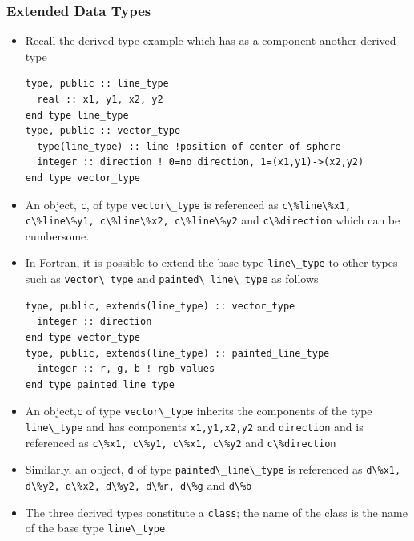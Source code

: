 \documentclass[c,mathserif,compress,xcolor=svgnames]{beamer}
\newcommand{\lstfortran}[1]{\lstinline[language={[90]Fortran},basicstyle=\footnotesize\ttfamily]|#1|}
\begin{document}
\begin{frame}
  \frametitle{\small Extended Data Types}
  \begin{itemize}
    \item Recall the derived type example which has as a component another derived type
      \begin{lstlisting}[language={[90]Fortran}]
type, public :: line_type 
  real :: x1, y1, x2, y2
end type line_type 
type, public :: vector_type
  type(line_type) :: line !position of center of sphere
  integer :: direction ! 0=no direction, 1=(x1,y1)->(x2,y2) 
end type vector_type
      \end{lstlisting}
    \item An object, \lstfortran{c}, of type \lstfortran{vector\_type} is referenced as \lstfortran{c\%line\%x1, c\%line\%y1, c\%line\%x2, c\%line\%y2} and \lstfortran{c\%direction} which can be cumbersome.
      \framebreak
    \item In Fortran, it is possible to extend the base type \lstfortran{line\_type} to other types such as \lstfortran{vector\_type} and \lstfortran{painted\_line\_type} as follows
      \begin{lstlisting}[language={[90]Fortran}]
type, public, extends(line_type) :: vector_type 
  integer :: direction
end type vector_type 
type, public, extends(line_type) :: painted_line_type
  integer :: r, g, b ! rgb values 
end type painted_line_type
      \end{lstlisting}
    \item An object,\lstfortran{c} of type \lstfortran{vector\_type} inherits the components of the type \lstfortran{line\_type} and has components \lstfortran{x1,y1,x2,y2} and \lstfortran{direction} and is referenced as \lstfortran{c\%x1, c\%y1, c\%x1, c\%y2} and \lstfortran{c\%direction} 
    \item Similarly, an object, \lstfortran{d} of type \lstfortran{painted\_line\_type} is referenced as \lstfortran{d\%x1, d\%y2, d\%x2, d\%y2, d\%r, d\%g} and \lstfortran{d\%b}
    \item The three derived types constitute a \lstfortran{class}; the name of the class is the name of the base type \lstfortran{line\_type}
  \end{itemize}
\end{frame}
\end{document}
